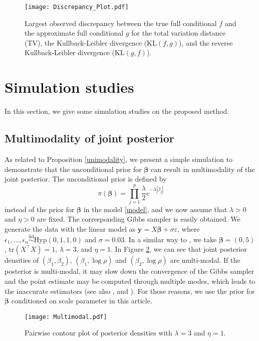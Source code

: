 \documentclass[11pt]{article}
\theoremstyle{plain}
\theoremstyle{definition}
\begin{document}
\begin{figure}[htbp]
\centering
\texttt{[image: Discrepancy\_Plot.pdf]}
\caption{Largest observed discrepancy between the true full conditional $f$ and the approximate full conditional $g$ for the total variation distance (TV), the Kullback-Leibler divergence ($\mathrm{KL}(f,g)$), and  the reverse Kullback-Leibler divergence ($\mathrm{KL}(g,f)$).}
\label{distance_plot}
\end{figure}


\section{Simulation studies}
\label{sec:4}

In this section, we give some simulation studies on the proposed method.

\subsection{Multimodality of joint posterior}
\label{subsec:4.1}

As related to Proposition \ref{unimodality}, we present a simple simulation to demonstrate that the unconditional prior for $\bm{\beta}$ can result in multimodality of the joint posterior. The unconditional prior is defined by
\[ \pi(\bm{\beta}) =\prod_{j=1}^p \frac{\lambda}{2}e^{-\lambda|\beta_j|}\]
instead of the prior for $\bm{\beta}$ in the model \eqref{model}, and we now assume that $\lambda>0$ and $\eta>0$ are fixed. The corresponding Gibbs sampler is easily obtained. 
We generate the data with the linear model as $\bm{y}=X\bm{\beta}+\sigma \varepsilon$, where $\epsilon_1,\dots,\epsilon_n \overset{\mathrm{iid}}{\sim} \mathrm{Hyp}(0 , 1 , 1 , 0)$ and $\sigma=0.03$. In a similar way to \cite{CS21}, we take $\bm{\beta}=(0,5)$, $\mathrm{tr}(X^{\top}X)=1$, $\lambda=3$, and $\eta=1$. In Figure \ref{fig:multimodal}, we can see that joint posterior densities of $(\beta_1,\beta_2)$, $(\beta_1,\log \rho)$ and $(\beta_2, \log \rho)$ are multi-modal. If the posterior is multi-modal, it may slow down the convergence of the Gibbs sampler and the point estimate may be computed through multiple modes, which leads to the inaccurate estimators (see also \cite{PC08}, \cite{KGGC10} and \cite{CS21}). For these reasons, we use the prior for $\bm{\beta}$ conditioned on scale parameter in this article. 

\begin{figure}[htpb]
\centering
\texttt{[image: Multimodal.pdf]}
\caption{Pairwise contour plot of posterior densities with $\lambda=3$ and $\eta=1$.} 
\label{fig:multimodal}
\end{figure}
\end{document}
